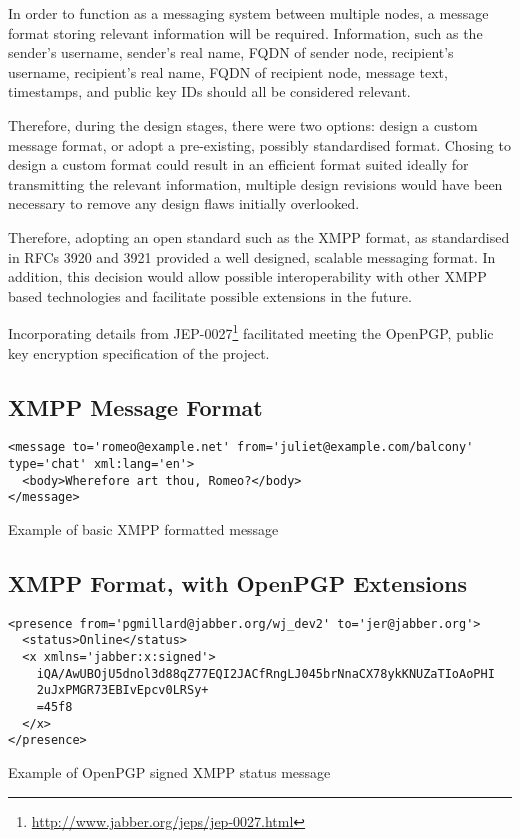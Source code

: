
In order to function as a messaging system between multiple nodes, a
message format storing relevant information will be required. 
Information, such as the sender's username, sender's real name, FQDN of 
sender node, recipient's username, recipient's real name, FQDN of 
recipient node, message text, timestamps, and public key IDs should all
be considered relevant. 


Therefore, during the design stages, there were two options: design a 
custom message format, or adopt a pre-existing, possibly standardised 
format. Chosing to design a custom format could result in an efficient 
format suited ideally for transmitting the relevant information, 
multiple design revisions would have been necessary to remove any
design flaws initially overlooked. 


Therefore, adopting an open standard such as the XMPP format, as 
standardised in RFCs 3920 and 3921 provided a well designed, scalable 
messaging format. In addition, this decision would allow possible 
interoperability with other XMPP based technologies and facilitate 
possible extensions in the future.


Incorporating details from
JEP-0027\footnote{\url{http://www.jabber.org/jeps/jep-0027.html}} 
facilitated meeting the OpenPGP, public key encryption 
specification of the project.

\subsection{XMPP Message Format}

\begin{table}[hbt]

\begin{verbatim}
<message to='romeo@example.net' from='juliet@example.com/balcony' 
type='chat' xml:lang='en'>
  <body>Wherefore art thou, Romeo?</body>
</message>
\end{verbatim}

\caption{Example of basic XMPP formatted message}

\end{table}


\subsection{XMPP Format, with OpenPGP Extensions}


\begin{table}[hbt]

\begin{verbatim}
<presence from='pgmillard@jabber.org/wj_dev2' to='jer@jabber.org'>
  <status>Online</status>
  <x xmlns='jabber:x:signed'>
    iQA/AwUBOjU5dnol3d88qZ77EQI2JACfRngLJ045brNnaCX78ykKNUZaTIoAoPHI
    2uJxPMGR73EBIvEpcv0LRSy+
    =45f8
  </x>
</presence>
\end{verbatim}

\caption{Example of OpenPGP signed XMPP status message}

\end{table}


